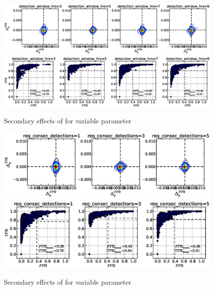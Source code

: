 \begin{figure}[!h]
\begin{center}
\includegraphics[width=6in]{../fig/final/delta_hist_sec/w_smooth/detection_window_hrs}
\includegraphics[width=5.5in]{../fig/final/position/all_allowed/w_smooth/detection_window_hrs}
\end{center}
\caption{\label{fig:delta_sec6} Secondary effects of  for
  variable parameter }
\end{figure}

\begin{figure}[!h]
\begin{center}
\includegraphics[width=6in]{../fig/final/delta_hist_sec/w_smooth/req_consec_detections}
\includegraphics[width=5.5in]{../fig/final/position/all_allowed/w_smooth/req_consec_detections}
\end{center}
\caption{\label{fig:sec} Secondary effects of  for variable
  parameter }
\end{figure}


